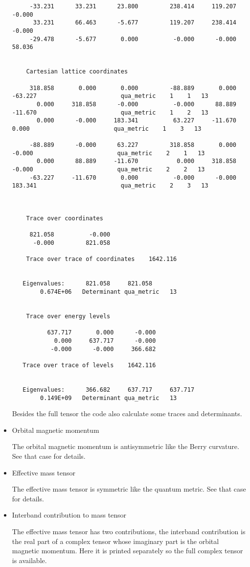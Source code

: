 \documentclass[11pt]{article}
\begin{document}
\begin{itemize}
\begin{verbatim}
     -33.231      33.231      23.800         238.414     119.207      -0.000
      33.231      66.463      -5.677         119.207     238.414      -0.000
     -29.478      -5.677       0.000          -0.000      -0.000      58.036


    Cartesian lattice coordinates

     318.858       0.000       0.000         -88.889       0.000     -63.227                        qua_metric    1    1   13
       0.000     318.858      -0.000          -0.000      88.889     -11.670                        qua_metric    1    2   13
       0.000      -0.000     183.341          63.227     -11.670       0.000                        qua_metric    1    3   13

     -88.889      -0.000      63.227         318.858       0.000      -0.000                        qua_metric    2    1   13
       0.000      88.889     -11.670           0.000     318.858      -0.000                        qua_metric    2    2   13
     -63.227     -11.670       0.000          -0.000      -0.000     183.341                        qua_metric    2    3   13



    Trace over coordinates

     821.058          -0.000
      -0.000         821.058

    Trace over trace of coordinates    1642.116


   Eigenvalues:      821.058     821.058
        0.674E+06   Determinant qua_metric   13


    Trace over energy levels

          637.717       0.000      -0.000
            0.000     637.717      -0.000
           -0.000      -0.000     366.682

   Trace over trace of levels    1642.116


   Eigenvalues:      366.682     637.717     637.717
        0.149E+09   Determinant qua_metric   13
      \end{verbatim}
      Besides the full tensor the code also calculate some traces and determinants.


      \item{Orbital magnetic momentum}

      The orbital magnetic momentum is antisymmetric like the Berry curvature.  See that case for details.

      \item{Effective mass tensor}

      The effective mass tensor is symmetric like the quantum metric.  See that case for details.

      \item{Interband contribution to mass tensor}

      The effective mass tensor has two contributions, the interband contribution is the real part
      of a complex tensor whose imaginary part is the orbital magnetic momentum.
      Here it is printed separately so the full complex tensor is available.

   \end{itemize}
\end{document}
